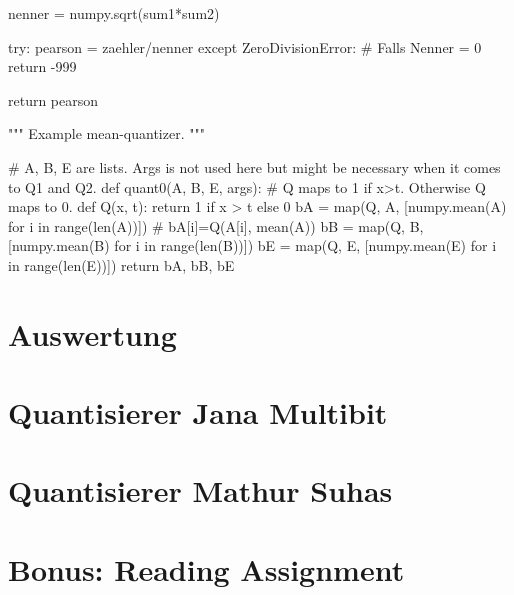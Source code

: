 \documentclass[12pt,a4paper]{article}
\begin{document}
\begin{python}
    nenner = numpy.sqrt(sum1*sum2)

    try:
        pearson = zaehler/nenner
    except ZeroDivisionError: # Falls Nenner = 0
        return -999 
    
    return pearson



"""
Example mean-quantizer.
"""


# A, B, E are lists. Args is not used here but might be necessary when it comes to Q1 and Q2.
def quant0(A, B, E, args):
    # Q maps to 1 if x>t. Otherwise Q maps to 0.
    def Q(x, t): return 1 if x > t else 0
    bA = map(Q, A, [numpy.mean(A)
                    for i in range(len(A))])  # bA[i]=Q(A[i], mean(A))
    bB = map(Q, B, [numpy.mean(B) for i in range(len(B))])
    bE = map(Q, E, [numpy.mean(E) for i in range(len(E))])
    return bA, bB, bE

\end{python}

\section{Auswertung}

\section{Quantisierer Jana Multibit}

\section{Quantisierer Mathur Suhas}

\section{Bonus: Reading Assignment}



\begin{comment}
\href{https://www.rub.de}{hier klicken}


\begin{figure}[hbt!]
	\centering
		\includegraphics[width=1\textwidth ]
		{Bilder/a3_rtl_sdr.jpg}
		\caption{Hier Caption einfügen}
		\label{fig:Labelx}
\end{figure}

~\ref{fig:Labelx}

\begin{python}
print("Hello World")
\end{python}

\hspace{0.5mm}

\end{comment}
\end{document}
